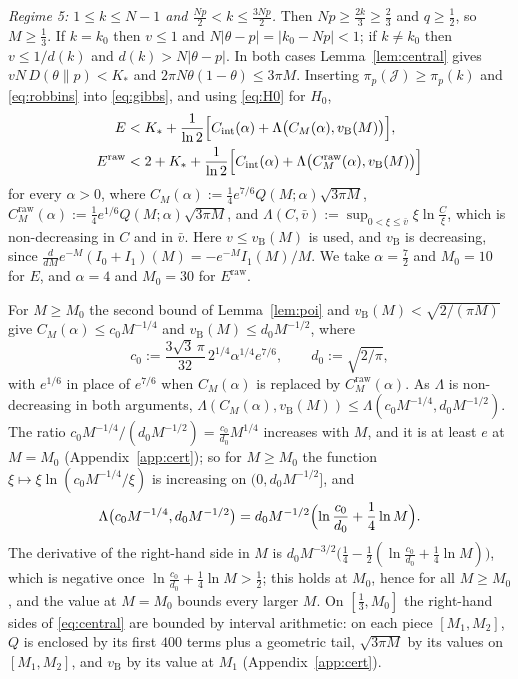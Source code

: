 \documentclass[11pt]{amsart}
\theoremstyle{remark}
\newcommand{\J}{\mathcal{J}}
\begin{document}
\emph{Regime 5: $1 \le k \le N - 1$ and $\frac{Np}{2} < k \le \frac{3Np}{2}$.} Then $Np \ge \frac{2k}{3} \ge \frac23$ and $q \ge \frac12$, so $M \ge \frac13$. If $k = k_0$ then $v \le 1$ and $N|\theta - p| = |k_0 - Np| < 1$; if $k \ne k_0$ then $v \le 1/d(k)$ and $d(k) > N|\theta - p|$. In both cases Lemma~\ref{lem:central} gives $vN\,D(\theta\|p) < K_*$ and $2\pi N\theta(1-\theta) \le 3\pi M$. Inserting $\pi_p(\J) \ge \pi_p(k)$ and \eqref{eq:robbins} into \eqref{eq:gibbs}, and using \eqref{eq:H0} for $H_0$,
\begin{equation}\label{eq:central}
\begin{split}
E &< K_* + \frac{1}{\ln 2}\Bigl[C_{\mathrm{int}}(\alpha) + \Lambda\bigl(C_M(\alpha), v_{\mathrm B}(M)\bigr)\Bigr],\\
E^{\mathrm{raw}} &< 2 + K_* + \frac{1}{\ln 2}\Bigl[C_{\mathrm{int}}(\alpha) + \Lambda\bigl(C^{\mathrm{raw}}_M(\alpha), v_{\mathrm B}(M)\bigr)\Bigr]
\end{split}
\end{equation}
for every $\alpha > 0$, where $C_M(\alpha) := \frac14 e^{7/6}Q(M;\alpha)\sqrt{3\pi M}$, $C^{\mathrm{raw}}_M(\alpha) := \frac14 e^{1/6}Q(M;\alpha)\sqrt{3\pi M}$, and $\Lambda(C, \bar v) := \sup_{0 < \xi \le \bar v} \xi\ln\frac{C}{\xi}$, which is non-decreasing in $C$ and in $\bar v$. Here $v \le v_{\mathrm B}(M)$ is used, and $v_{\mathrm B}$ is decreasing, since $\frac{d}{dM}e^{-M}(I_0 + I_1)(M) = -e^{-M}I_1(M)/M$. We take $\alpha = \frac72$ and $M_0 = 10$ for $E$, and $\alpha = 4$ and $M_0 = 30$ for $E^{\mathrm{raw}}$.

For $M \ge M_0$ the second bound of Lemma~\ref{lem:poi} and $v_{\mathrm B}(M) < \sqrt{2/(\pi M)}$ give $C_M(\alpha) \le c_0M^{-1/4}$ and $v_{\mathrm B}(M) \le d_0M^{-1/2}$, where
\[
c_0 := \frac{3\sqrt3\,\pi}{32}\,2^{1/4}\alpha^{1/4}e^{7/6}, \qquad d_0 := \sqrt{2/\pi},
\]
with $e^{1/6}$ in place of $e^{7/6}$ when $C_M(\alpha)$ is replaced by $C^{\mathrm{raw}}_M(\alpha)$. As $\Lambda$ is non-decreasing in both arguments, $\Lambda(C_M(\alpha), v_{\mathrm B}(M)) \le \Lambda(c_0M^{-1/4}, d_0M^{-1/2})$. The ratio $c_0M^{-1/4}/(d_0M^{-1/2}) = \frac{c_0}{d_0}M^{1/4}$ increases with $M$, and it is at least $e$ at $M = M_0$ (Appendix~\ref{app:cert}); so for $M \ge M_0$ the function $\xi \mapsto \xi\ln(c_0M^{-1/4}/\xi)$ is increasing on $(0, d_0M^{-1/2}]$, and
\[
\Lambda\bigl(c_0M^{-1/4}, d_0M^{-1/2}\bigr) = d_0M^{-1/2}\Bigl(\ln\frac{c_0}{d_0} + \frac14\ln M\Bigr).
\]
The derivative of the right-hand side in $M$ is $d_0M^{-3/2}\bigl(\frac14 - \frac12(\ln\frac{c_0}{d_0} + \frac14\ln M)\bigr)$, which is negative once $\ln\frac{c_0}{d_0} + \frac14\ln M > \frac12$; this holds at $M_0$, hence for all $M \ge M_0$, and the value at $M = M_0$ bounds every larger $M$. On $[\frac13, M_0]$ the right-hand sides of \eqref{eq:central} are bounded by interval arithmetic: on each piece $[M_1, M_2]$, $Q$ is enclosed by its first $400$ terms plus a geometric tail, $\sqrt{3\pi M}$ by its values on $[M_1, M_2]$, and $v_{\mathrm B}$ by its value at $M_1$ (Appendix~\ref{app:cert}).
\end{document}
